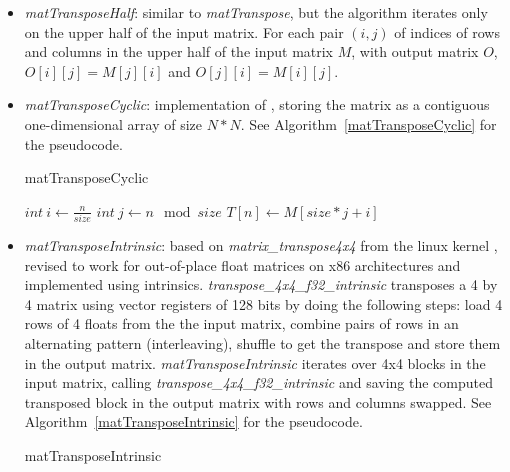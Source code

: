\documentclass[conference]{IEEEtran}
\begin{document}
\begin{itemize}
  \item \textit{matTransposeHalf}: similar to \textit{matTranspose}, but the algorithm
  iterates only on the upper half of the input matrix. For each
  pair $(i,j)$ of indices of rows and columns in the upper half of the input matrix $M$, with output matrix $O$, $O[i][j]=M[j][i]$ and $O[j][i] = M[i][j]$.

  
\item \textit{matTransposeCyclic}: implementation of \cite{b28}, storing the matrix as a contiguous one-dimensional array of size $N*N$. See Algorithm~\ref{matTransposeCyclic} for the pseudocode.
  \begin{algorithm}
  	\caption{matTransposeCyclic}\label{matTransposeCyclic}
  \begin{algorithmic}[1]

        \State $int\ \textit{i} \gets \frac{n}{size}$
        \State $int\ \textit{j} \gets n \mod size$
        \State $T[n] \gets M[size * j + i]$
        \EndFor
          \end{algorithmic}
  \end{algorithm}

\item \textit{matTransposeIntrinsic}: based on \textit{matrix\_transpose4x4} from the linux kernel \cite{b16}, revised to work for out-of-place float matrices on x86 architectures and implemented using intrinsics. \textit{transpose\_4x4\_f32\_intrinsic} transposes a 4 by 4 matrix using vector registers of 128 bits by doing the following steps: load 4 rows of 4 floats from the the input matrix, combine pairs of rows in an alternating pattern (interleaving), shuffle to get the transpose and store them in the output matrix. \textit{matTransposeIntrinsic} iterates over 4x4 blocks in the input matrix, calling \textit{transpose\_4x4\_f32\_intrinsic} and saving the computed transposed block in the output matrix with rows and columns swapped. See Algorithm~\ref{matTransposeIntrinsic} for the pseudocode.
  \begin{algorithm}
	\caption{matTransposeIntrinsic}\label{matTransposeIntrinsic}
	    \begin{algorithmic}[1]
	\iffalse


\end{algorithmic}
\end{algorithm}
\end{itemize}
\end{document}
